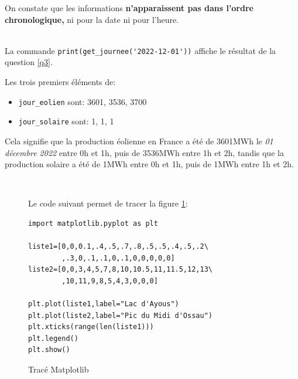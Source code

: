 On constate que les informations \textbf{n’apparaissent pas dans l'ordre chronologique,} ni pour la date ni pour l'heure.


~\ \\

La commande \verb?print(get_journee('2022-12-01'))? affiche le résultat de la question \ref{q3}.


\newpage

Les trois premiers éléments de:
\begin{itemize}
 \item \texttt{jour\_eolien} sont: 3601, 3536, 3700
 \item \texttt{jour\_solaire} sont: 1, 1, 1
\end{itemize}

Cela signifie que la production éolienne en France a été de 3601MWh le \textit{01 décembre 2022} entre 0h et 1h, puis de 3536MWh  entre 1h et 2h, tandis que la production solaire a été de 1MWh entre 0h et 1h, puis de 1MWh  entre 1h et 2h.

~\

\begin{figure}[ht!]
\begin{minipage}{0.5\linewidth}
Le code suivant permet de tracer la figure \ref{fig:img3}:
\begin{verbatim}
import matplotlib.pyplot as plt

liste1=[0,0,0.1,.4,.5,.7,.8,.5,.5,.4,.5,.2\
		,.3,0,.1,.1,0,.1,0,0,0,0,0]
liste2=[0,0,3,4,5,7,8,10,10.5,11,11.5,12,13\
		,10,11,9,8,5,4,3,0,0,0]

plt.plot(liste1,label="Lac d'Ayous")
plt.plot(liste2,label="Pic du Midi d'Ossau")
plt.xticks(range(len(liste1)))
plt.legend()
plt.show()
\end{verbatim}
\end{minipage}\hfill
\begin{minipage}{0.45\linewidth}
\centering\resizebox{0.9\textwidth}{!}{}
\caption{\label{fig:img3} Tracé Matplotlib}
\end{minipage}
\end{figure}

